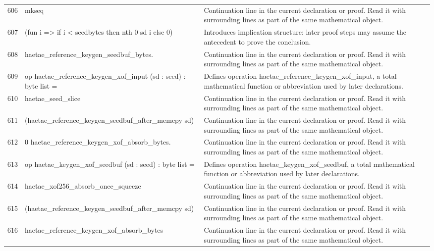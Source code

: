 \documentclass[10pt]{article}
\begin{document}
\begin{longtable}{r L{0.53\textwidth} L{0.37\textwidth}}
606 & {\ttfamily\scriptsize   mkseq} & Continuation line in the current declaration or proof.  Read it with surrounding lines as part of the same mathematical object. \\
607 & {\ttfamily\scriptsize     (fun i => if i < seedbytes then nth 0 sd i else 0)} & Introduces implication structure: later proof steps may assume the antecedent to prove the conclusion. \\
608 & {\ttfamily\scriptsize     haetae\_reference\_keygen\_seedbuf\_bytes.} & Continuation line in the current declaration or proof.  Read it with surrounding lines as part of the same mathematical object. \\
609 & {\ttfamily\scriptsize op haetae\_reference\_keygen\_xof\_input (sd : seed) : byte list =} & Defines operation haetae\_reference\_keygen\_xof\_input, a total mathematical function or abbreviation used by later declarations. \\
610 & {\ttfamily\scriptsize   haetae\_seed\_slice} & Continuation line in the current declaration or proof.  Read it with surrounding lines as part of the same mathematical object. \\
611 & {\ttfamily\scriptsize     (haetae\_reference\_keygen\_seedbuf\_after\_memcpy sd)} & Continuation line in the current declaration or proof.  Read it with surrounding lines as part of the same mathematical object. \\
612 & {\ttfamily\scriptsize     0 haetae\_reference\_keygen\_xof\_absorb\_bytes.} & Continuation line in the current declaration or proof.  Read it with surrounding lines as part of the same mathematical object. \\
613 & {\ttfamily\scriptsize op haetae\_keygen\_xof\_seedbuf (sd : seed) : byte list =} & Defines operation haetae\_keygen\_xof\_seedbuf, a total mathematical function or abbreviation used by later declarations. \\
614 & {\ttfamily\scriptsize   haetae\_xof256\_absorb\_once\_squeeze} & Continuation line in the current declaration or proof.  Read it with surrounding lines as part of the same mathematical object. \\
615 & {\ttfamily\scriptsize     (haetae\_reference\_keygen\_seedbuf\_after\_memcpy sd)} & Continuation line in the current declaration or proof.  Read it with surrounding lines as part of the same mathematical object. \\
616 & {\ttfamily\scriptsize     haetae\_reference\_keygen\_xof\_absorb\_bytes} & Continuation line in the current declaration or proof.  Read it with surrounding lines as part of the same mathematical object. \\

\end{longtable}
\end{document}
